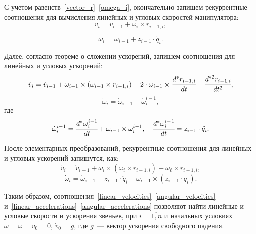 С учетом равенств~\eqref{vector_r}--\eqref{omega_i}, окончательно запишем рекуррентные соотношения для вычисления линейных и угловых скоростей манипулятора:
\begin{equation}\label{linear_velocities}
	v_i = v_{i-1} + \omega_{i} \times r_{i-1,i}, %
\end{equation}

\begin{equation}\label{angular_velocities}
	\omega_i = \omega_{i-1} + z_{i-1} \cdot \dot{q}_i.
\end{equation}

Далее, согласно теореме о сложении ускорений, запишем соотношения для линейных и угловых ускорений:
\begin{equation}
	\dot{v}_i = \dot{v}_{i-1} + \omega_{i-1} \times (\omega_{i-1} \times r_{i-1,i}) + 2 \cdot \omega_{i-1} \times \cfrac{d^* r_{i-1,i}}{dt} + \cfrac{d^{*2} r_{i-1,i}}{dt^2},
\end{equation}
\begin{equation}
	\dot{\omega}_{i} = \dot{\omega}_{i-1} + \dot{\omega}^{i-1}_{i},
\end{equation}
где 
\begin{equation}
	\dot{\omega}^{i-1}_{i} = \cfrac{d^{*} \omega^{i-1}_{i}}{dt} + \omega_{i-1} \times \omega^{i-1}_{i},
	\quad
	\cfrac{d^{*} \omega^{i-1}_{i}}{dt} = z_{i-1} \cdot \ddot{q}_i.
\end{equation}

После элементарных преобразований, рекуррентные соотношения для линейных и угловых ускорений запишутся, как:
\begin{equation}\label{linear_accelerations}
	\dot{v}_i = \dot{v}_{i-1} + \omega_{i} \times (\omega_{i} \times r_{i-1,i}) + \dot{\omega}_i \times r_{i-1,i}, %
\end{equation}
\begin{equation}\label{angular_accelerations}
	\dot{\omega}_i = \dot{\omega}_{i-1} + z_{i-1} \cdot \ddot{q}_i + \omega_{i-1} \times (z_{i-1} \cdot \dot{q}_i).
\end{equation}

Таким образом, соотношения~\eqref{linear_velocities}--\eqref{angular_velocities} и~\eqref{linear_accelerations}--\eqref{angular_accelerations} позволяют найти линейные и угловые скорости и ускорения звеньев, при $i=\overline{1,n}$ и начальных условиях $\omega = \dot{\omega} = v_0 = 0$, $\dot{v}_0 = g$, где $g$~--- вектор ускорения свободного падения.

